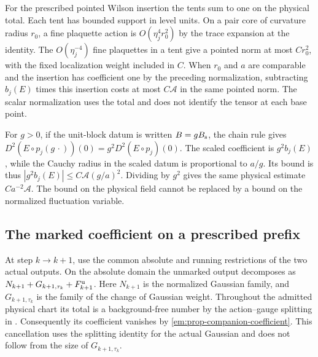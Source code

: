 \documentclass[11pt,letterpaper,reqno]{amsart}
\numberwithin{equation}{section}
\theoremstyle{definition}
\theoremstyle{remark}
\begin{document}
For the prescribed pointed Wilson insertion the tents sum to one
on the physical total. Each tent has bounded support in level units.
On a pair core of curvature radius $r_0$, a fine plaquette action is
$O(\eta_j^4 r_0^2)$ by the trace expansion at the identity. The
$O(\eta_j^{-4})$ fine plaquettes in a tent give a pointed norm at
most $C r_0^2$, with the fixed localization weight included in $C$.
When $r_0$ and $a$ are comparable and the insertion has coefficient
one by the preceding normalization, subtracting
$b_j(E)$ times this insertion costs at most $C\mathcal A$ in the
same pointed norm. The scalar normalization uses the total and
does not identify the tensor at each base point.

For $g>0$, if the unit-block datum is written $B=gB_{\rm s}$, the chain rule gives
$D^2(E\circ p_j(g\,\cdot))(0)=g^2D^2(E\circ p_j)(0)$. The scaled
coefficient is $g^2b_j(E)$, while the Cauchy radius in the scaled
datum is proportional to $a/g$. Its bound is thus
$|g^2b_j(E)|\le C\mathcal A(g/a)^2$. Dividing by $g^2$ gives the
same physical estimate $C a^{-2}\mathcal A$. The bound on the
physical field cannot be replaced by a bound on the normalized
fluctuation variable.

\subsection{The marked coefficient on a prescribed prefix}

At step $k\to k+1$, use the common absolute and running restrictions
of the two actual outputs. On the absolute domain the unmarked
output decomposes as $N_{k+1}+G_{k+1,\tau_k}+F_{k+1}^{\rm u}$.
Here $N_{k+1}$ is the normalized Gaussian family, and
$G_{k+1,\tau_k}$ is the family of the change of Gaussian weight.
Throughout the admitted physical chart its total is a background-free
number by the action--gauge splitting in
\cite[Proposition~4.3]{GI}. Consequently its coefficient
vanishes by \cref{em:prop-companion-coefficient}. This cancellation
uses the splitting identity for the actual Gaussian and does not
follow from the size of $G_{k+1,\tau_k}$.
\end{document}
